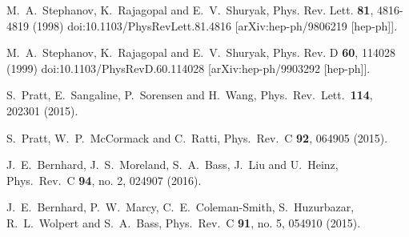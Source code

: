 \begin{thebibliography}{99}
M.~A.~Stephanov, K.~Rajagopal and E.~V.~Shuryak,
Phys. Rev. Lett. \textbf{81}, 4816-4819 (1998)
doi:10.1103/PhysRevLett.81.4816
[arXiv:hep-ph/9806219 [hep-ph]].

M.~A.~Stephanov, K.~Rajagopal and E.~V.~Shuryak,
Phys. Rev. D \textbf{60}, 114028 (1999)
doi:10.1103/PhysRevD.60.114028
[arXiv:hep-ph/9903292 [hep-ph]].








  S.~Pratt, E.~Sangaline, P.~Sorensen and H.~Wang,
  Phys.\ Rev.\ Lett.\  {\bf 114}, 202301 (2015).
  
	
  S.~Pratt, W.~P.~McCormack and C.~Ratti,
  Phys.\ Rev.\ C {\bf 92}, 064905 (2015).
  
  J.~E.~Bernhard, J.~S.~Moreland, S.~A.~Bass, J.~Liu and U.~Heinz,
  Phys.\ Rev.\ C {\bf 94}, no. 2, 024907 (2016).
  
  J.~E.~Bernhard, P.~W.~Marcy, C.~E.~Coleman-Smith, S.~Huzurbazar, R.~L.~Wolpert and S.~A.~Bass,
  Phys.\ Rev.\ C {\bf 91}, no. 5, 054910 (2015).


\end{thebibliography}
